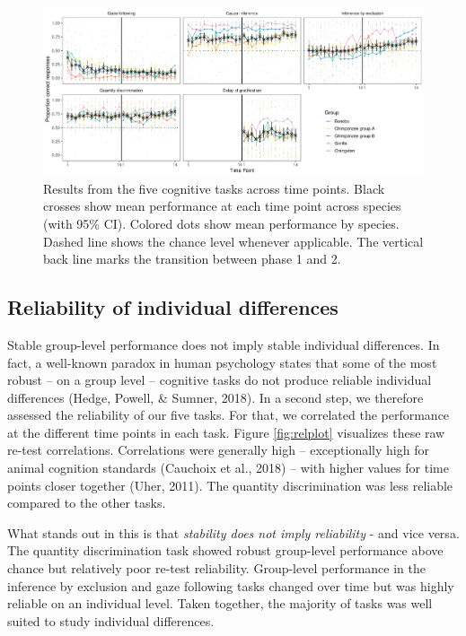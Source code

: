 \documentclass[
  man,floatsintext]{apa6}
\begin{document}
\begin{figure}
\includegraphics[width=1\linewidth]{./figures/performance} \caption{Results from the five cognitive tasks across time points. Black crosses show mean performance at each time point across species (with 95\% CI). Colored dots show mean performance by species. Dashed line shows the chance level whenever applicable. The vertical back line marks the transition between phase 1 and 2.}\label{fig:perfplot}
\end{figure}

\hypertarget{reliability-of-individual-differences}{%
\subsection{Reliability of individual differences}\label{reliability-of-individual-differences}}

Stable group-level performance does not imply stable individual differences. In fact, a well-known paradox in human psychology states that some of the most robust -- on a group level -- cognitive tasks do not produce reliable individual differences (Hedge, Powell, \& Sumner, 2018). In a second step, we therefore assessed the reliability of our five tasks. For that, we correlated the performance at the different time points in each task. Figure \ref{fig:relplot} visualizes these raw re-test correlations. Correlations were generally high -- exceptionally high for animal cognition standards (Cauchoix et al., 2018) -- with higher values for time points closer together (Uher, 2011). The quantity discrimination was less reliable compared to the other tasks.

What stands out in this is that \emph{stability does not imply reliability} - and vice versa. The quantity discrimination task showed robust group-level performance above chance but relatively poor re-test reliability. Group-level performance in the inference by exclusion and gaze following tasks changed over time but was highly reliable on an individual level. Taken together, the majority of tasks was well suited to study individual differences.
\end{document}
